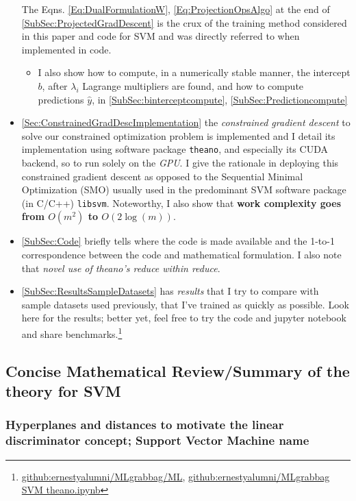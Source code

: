 \documentclass[10pt]{amsart}
\begin{document}
\begin{multicols*}{2}
\begin{itemize}
  The Eqns. \ref{Eq:DualFormulationW}, \ref{Eq:ProjectionOpsAlgo} at the end of \ref{SubSec:ProjectedGradDescent} is the crux of the training method considered in this paper and code for SVM and was directly referred to when implemented in code.  
  \begin{itemize}
  \item I also show how to compute, in a numerically stable manner, the intercept $b$, after $\lambda_i$ Lagrange multipliers are found, and how to compute predictions $\widehat{y}$, in \ref{SubSec:binterceptcompute}, \ref{SubSec:Predictioncompute}
  \end{itemize}
  \item \ref{Sec:ConstrainedGradDescImplementation} the \emph{constrained gradient descent} to solve our constrained optimization problem is implemented and I detail its implementation using software package \verb|theano|, and especially its CUDA backend, so to run solely on the \emph{GPU}.  I give the rationale in deploying this constrained gradient descent as opposed to the Sequential Minimal Optimization (SMO) usually used in the predominant SVM software package (in C/C++) \verb|libsvm|.  Noteworthy, I also show that \textbf{work complexity goes from $O(m^2)$ to $O(2\log(m))$}.  
\item \ref{SubSec:Code} briefly tells where the code is made available and the 1-to-1 correspondence between the code and mathematical formulation.  I also note that \emph{novel use of theano's reduce within reduce}.  
\item \ref{SubSec:ResultsSampleDatasets} has \emph{results} that I try to compare with sample datasets used previously, that I've trained as quickly as possible.  Look here for the results; better yet, feel free to try the code and jupyter notebook and share benchmarks.\footnote{\href{https://github.com/ernestyalumni/MLgrabbag/blob/master/ML/SVM.py}{github:ernestyalumni/MLgrabbag/ML}, \href{https://github.com/ernestyalumni/MLgrabbag/blob/master/SVM_theano.ipynb}{github:ernestyalumni/MLgrabbag SVM theano.ipynb}}
\end{itemize}

\subsection{Concise Mathematical Review/Summary of the theory for SVM}\label{Sec:ConciseMathReview}

\subsubsection{Hyperplanes and distances to motivate the linear discriminator concept; Support Vector Machine name}\label{SubSec:Hyperplanes}


\end{multicols*}
\end{document}
